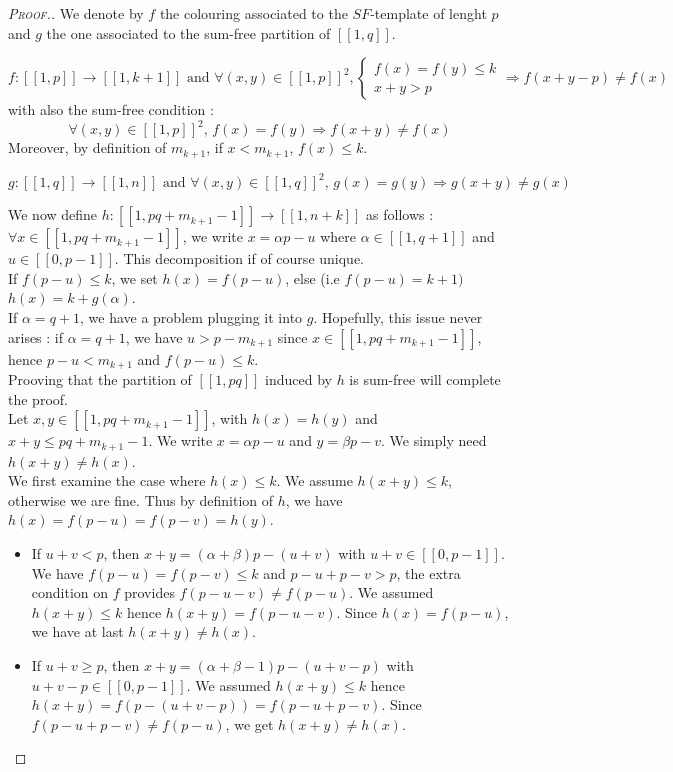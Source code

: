 \begin{proof}[\textsc{Proof.}]
We denote by \(f\) the colouring associated to the \(SF\)-template of lenght \(p\)
and \(g\) the one associated to the sum-free partition of \([\![1,q]\!]\).

\[ f : [\![1,p]\!] \longrightarrow [\![1,k+1]\!] \text{ and } \forall (x,y) \in [\![1,p]\!]^2, \left\{
\begin{array}{ll}
	f(x) = f(y) \leqslant k \\
	x + y > p
\end{array}
\right.
\Longrightarrow f(x+y-p) \neq f(x)
\]
with also the sum-free condition : \[ \forall (x,y) \in [\![1,p]\!]^2 \text{, } f(x) = f(y)
\Longrightarrow f(x+y) \neq f(x) \]
Moreover, by definition of \(m_{k+1}\), if \(x < m_{k+1}\), \(f(x) \leqslant k\).

\[g : [\![1,q]\!] \longrightarrow [\![1,n]\!] \text{ and } \forall (x,y) \in [\![1,q]\!]^2 \text{, } g(x) = g(y)
\Longrightarrow g(x+y) \neq g(x)
\]

We now define \(h : [\![1,pq+m_{k+1}-1]\!] \longrightarrow [\![1,n+k]\!] \) as follows :
\( \forall x \in [\![1,pq + m_{k+1}-1]\!] \), we write \(x = \alpha p - u\) where \(\alpha \in [\![1,q+1]\!] \) and \( u \in
[\![0,p-1]\!] \).
This decomposition if of course unique. \\

If \(f(p-u) \leqslant k\), we set \(h(x) = f(p-u)\), else (i.e \(f(p-u) = k + 1)\) \(h(x) = k + g(\alpha) \). \\
If \(\alpha = q+1\), we have a problem plugging it into \(g\). Hopefully, this issue never arises : if 
\(\alpha = q+1\), we have \(u > p - m_{k+1}\) since \(x \in [\![1,pq + m_{k+1}-1]\!]\), hence \(p-u < m_{k+1}\) and \(f(p-u) \leqslant k\). \\

Prooving that the partition of \([\![1,pq]\!]\) induced by \(h\) is sum-free will complete the proof.\\

Let \(x,y \in [\![1,pq + m_{k+1}-1]\!]\), with \(h(x) = h(y)\) and \(x+y \leqslant pq+m_{k+1}-1\). We write \(x = \alpha p - u\) and \(y =
\beta p - v\). We simply need \(h(x+y) \neq h(x)\). \\

We first examine the case where \(h(x) \leqslant k\). We assume \(h(x+y) \leqslant k\), otherwise we are fine. 
Thus by definition of \(h\), we have \(h(x) = f(p-u) = f(p-v) = h(y)\).
\begin{itemize}
\item If \(u+v < p\), then \(x+y = (\alpha+\beta)p - (u+v) \) with \(u+v \in [\![0,p-1]\!] \).
We have \(f(p-u) = f(p-v) \leqslant k\) and \(p-u + p-v > p\), the extra condition on \(f\) provides \(f(p-u-v) \neq
f(p-u)\).
We assumed \(h(x+y) \leqslant k\) hence \(h(x+y) = f(p-u-v)\). Since \(h(x) = f(p-u)\), we have at last \(h(x+y) \neq
h(x)\).
\item If \(u+v \geqslant p\), then \(x+y = (\alpha+\beta-1)p - (u+v-p) \) with \(u+v-p \in [\![0,p-1]\!] \).
We assumed \(h(x+y) \leqslant k \) hence \(h(x+y) = f( p- (u+v-p)) = f(p-u + p-v)\). Since \(f(p-u+p-v) \neq f(p-u)\),
we get \(h(x+y) \neq h(x)\).
\end{itemize} 
  

\end{proof}
